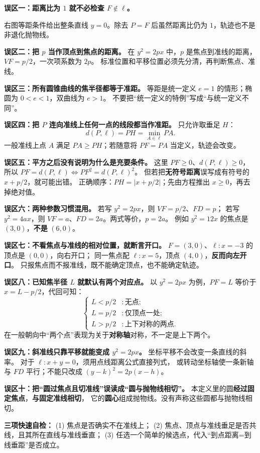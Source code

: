 \begin{trapbox}
\textbf{误区一：距离比为 $1$ 就不必检查 $F\notin\ell$。}

右图等距条件给出整条直线 $y=0$。除去 $P=F$ 后虽然距离比仍为 $1$，轨迹也不是非退化抛物线。

\textbf{误区二：把 $p$ 当作顶点到焦点的距离。}
在 $y^2=2px$ 中，$p$ 是焦点到准线的距离，$VF=p/2$，一次项系数为 $2p$。
标准位置和平移位置必须先分清，再判断焦点、准线。

\textbf{误区三：所有圆锥曲线的焦半径都等于准距。}
等距是统一定义 $e=1$ 的情形；椭圆为 $0<e<1$，双曲线为 $e>1$。
不要把“统一定义的特例”写成“与统一定义不同”。
\end{trapbox}
\clearpage

\begin{trapbox}
\textbf{误区四：把 $P$ 连向准线上任何一点的线段都当作准距。}
只允许取垂足 $H$：
\[d(P,\ell)=PH=\min_{A\in\ell}PA.\]
一般准线上点 $A$ 满足 $PA\ge PH$；若随意将 $PF=PA$ 当定义，轨迹会改变。

\medskip
\textbf{误区五：平方之后没有说明为什么是充要条件。}
这里 $PF\ge0$、$d(P,\ell)\ge0$，
所以 $PF=d(P,\ell)\iff PF^2=d(P,\ell)^2$。
但若把\textbf{无符号距离}误写成有符号的 $x+p/2$，就可能出错。
正确顺序：$PH=|x+p/2|$；先由方程推出 $x\ge0$，再去掉绝对值。

\medskip
\textbf{误区六：两种参数习惯混用。}
若写 $y^2=2px$，则 $VF=p/2$、$FD=p$；
若写 $y^2=4ax$，则 $VF=a$、$FD=2a$。两式等价，$p=2a$。
例如 $y^2=12x$ 的焦点是 $(3,0)$，\textbf{不是} $(6,0)$。

\medskip
\textbf{误区七：不看焦点与准线的相对位置，就断言开口。}
$F=(3,0)$、$\ell:x=-3$ 的顶点是 $(0,0)$，向右开口；
同一焦点配 $\ell:x=5$，顶点 $(4,0)$，\textbf{反而向左开口}。
只报焦点而不报准线，既不能确定顶点，也不能确定轨迹。
\end{trapbox}
\clearpage
\begin{trapbox}
\textbf{误区八：已知焦半径 $L$ 就默认有两个对应点。}
以 $y^2=2px$ 为例，$PF=L$ 等价于 $x=L-p/2$，代回可知：
\[
\begin{cases}
L<p/2 &: \text{无点};\\
L=p/2 &: \text{仅顶点一处};\\
L>p/2 &: \text{上下对称的两点}.
\end{cases}
\]
在一般朝向中“两个点”表现为关于\textbf{对称轴}对称，不一定是上下两个。

\medskip
\textbf{误区九：斜准线只靠平移就能变成 $y^2=2px$。}
坐标平移不会改变一条直线的斜率。
对于 $\ell:x+y=0$，须用点线距离公式直接列式，
或转动坐标轴使一条新轴与 $FD$ 平行；不能只改成 $(y-k)^2=2p(x-h)$。

\medskip
\textbf{误区十：把“圆过焦点且切准线”误读成“圆与抛物线相切”。}
本定义里的圆\textbf{经过固定焦点}，\textbf{与固定准线相切}，
它的\textbf{圆心}组成抛物线。没有声称这些圆都与抛物线相切。

\medskip
\textbf{三项快速自检：}
(1) 焦点是否确实不在准线上；
(2) 焦点、顶点与准线垂足是否共线，且其所在直线与准线垂直；
(3) 任选一个简单的候选点，代入“到点距离=到线垂距”是否成立。
\end{trapbox}
